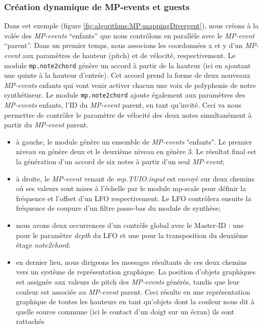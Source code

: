 \subsubsection{Création dynamique de MP-events et guests}

\noindent Dans cet exemple (figure \ref{fig:algorithms:MP-mappingDivergent}), nous créons à la volée des \textit{MP-events} ``enfants'' que nous contrôlons en parallèle avec le \textit{MP-event} ``parent''.
Dans un premier temps, nous associons les coordonnées x et y d'un \textit{MP-event} aux paramètres de hauteur (pitch) et de vélocité, respectivement. Le module \verb|mp.note2chord| génère un accord à partir de la hauteur (ici en ajoutant une quinte à la hauteur d'entrée). Cet accord prend la forme de deux nouveaux \textit{MP-events} enfants qui vont venir activer chacun une voix de polyphonie de notre synthétiseur. Le module \verb|mp.note2chord| ajoute également aux paramètres des \textit{MP-events} enfants, l'ID du \textit{MP-event} parent, en tant qu'invité. Ceci va nous permettre de contrôler le paramètre de vélocité des deux notes simultanément à partir du \textit{MP-event} parent. 

\vspace{-1em}
\begin{itemize}[noitemsep]
	\item à gauche, le module  génère un ensemble de \textit{MP-events} "enfants". Le premier niveau en génère deux et le deuxième niveau en génère 3. Le résultat final est la génération d'un accord de six notes à partir d'un seul \textit{MP-event};
	\item à droite, le \textit{MP-event} venant de \textit{mp.TUIO.input} est envoyé sur deux chemins où ses valeurs sont mises à l'échelle par le module mp-scale pour définir la fréquence et l'offset d'un LFO respectivement. Le \gls{LFO} contrôlera ensuite la fréquence de coupure d'un filtre passe-bas du module de synthèse;
	\item nous avons deux occurrences d'un contrôle global avec le Master-ID : une pour le paramètre \textit{depth} du LFO et une pour la transposition du deuxième étage \textit{note2chord};
	\item en dernier lieu, nous dirigeons les messages résultants de ces deux chemins vers un système de représentation graphique. La position d'objets graphiques est assignée aux valeurs de pitch des \textit{MP-events} générés, tandis que leur couleur est associée au \textit{MP-event} parent. Ceci résulte en une représentation graphique de toutes les hauteurs en tant qu'objets dont la couleur nous dit à quelle source commune (ici le contact d'un doigt sur un écran) ils sont rattachés
\end{itemize}

